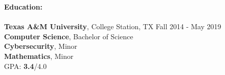 \documentclass[12pt]{article}
\begin{document}
\begin{flushleft}
    \begin{outline}[compactitem]

        \newlength{\upspacelength}
        \setlength{\upspacelength}{-0.6px}
        \newcommand{\upspace}{\vspace{\upspacelength}}
        \newcommand{\zzz}[1]{\upspace \0 \textbf{#1} \\ \vspace{-0.8\baselineskip} \hrulefill \vspace{-2px} \\ }
        \let\oldOne\1\let\oldTwo\2\let\oldThree\3\let\oldFour\4
        \renewcommand{\1}{\upspace \oldOne  }
        \renewcommand{\2}{\upspace \oldTwo  }
        \renewcommand{\3}{\upspace \oldThree}
        \renewcommand{\4}{\upspace \oldFour }



        \zzz{Education:}
        \1 \textbf{Texas A\&M University}, College Station, TX \hfill Fall 2014 - May 2019
        \\ \textbf{Computer Science}, Bachelor of Science
        \\ \textbf{Cybersecurity}, Minor
        \\ \textbf{Mathematics}, Minor
        \\ GPA\@:  \textbf{3.4}/4.0


\end{outline}
\end{flushleft}
\end{document}
